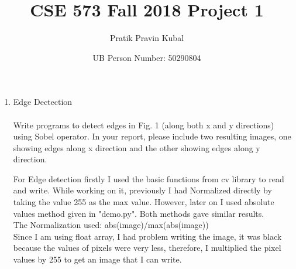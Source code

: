 \documentclass[12pt]{article}
\title{CSE 573 Fall 2018 Project 1}
\author{Pratik Pravin Kubal}
\date{UB Person Number: 50290804}
\newenvironment{QandA}
{
	\begin{enumerate}[label=\normalfont\arabic*.,leftmargin=2em,rightmargin=2em]\normalfont
	}
	{
	\end{enumerate}
}
\newenvironment{answered}{\setlength{\parindent}{1em}\par\normalfont}{}
\begin{document}
	\noindent%
	\maketitle
	\begin{QandA}
		\item Edge Dectection
		\\
		\\
			Write programs to detect edges in Fig. 1 (along both x and y directions) using Sobel operator. In your report, please include two resulting images, one showing edges along x direction and the other showing edges along y direction.
	\begin{answered}
		For Edge detection firstly I used the basic functions from cv library to read and write. While working on it, previously I had Normalized directly by taking the value 255 as the max value. However, later on I used absolute values method given in "demo.py". Both methods gave similar results.
		\\
		The Normalization used: 
		abs(image)/max(abs(image))
		\\
		Since I am using float array, I had problem writing the image, it was black because the values of pixels were very less, therefore, I multiplied the pixel values by 255 to get an image that I can write.
		\\
		\begin{figure}
		\centering

\end{figure}
\end{answered}
\end{QandA}
\end{document}
